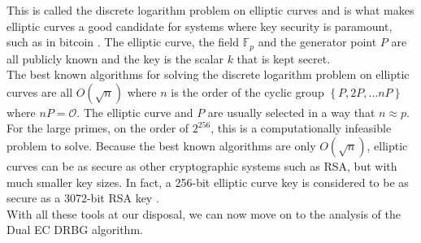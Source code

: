 
This is called the discrete logarithm problem on elliptic curves and is what makes elliptic curves a good candidate for systems where key security is paramount, such as in bitcoin \cite{wang2018ecdsa}. The elliptic curve, the field $\mathbb{F}_p$ and the generator point $P$ are all publicly known and the key is the scalar $k$ that is kept secret.
\\

The best known algorithms for solving the discrete logarithm problem on elliptic curves are all $O(\sqrt{n})$ where $n$ is the order of the cyclic group $\left\{P, 2P, \dots nP \right\}$ where $nP = \mathcal{O}$. The elliptic curve and $P$ are usually selected in a way that $n \approx p$. For the large primes, on the order of $2^{256}$, this is a computationally infeasible problem to solve. Because the best known algorithms are only $O(\sqrt{n})$, elliptic curves can be as secure as other cryptographic systems such as RSA, but with much smaller key sizes. In fact, a 256-bit elliptic curve key is considered to be as secure as a 3072-bit RSA key \cite{elliptic_curve_cryptography}.
\\

With all these tools at our disposal, we can now move on to the analysis of the Dual EC DRBG algorithm.
